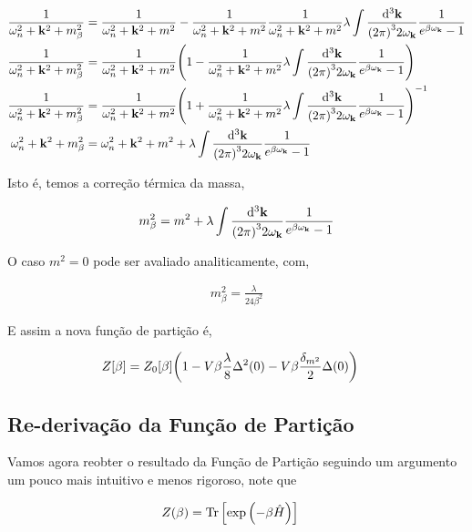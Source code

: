 \documentclass[twoside]{amsart}
\numberwithin{equation}{section}
\begin{document}
\begin{align}
    \frac{1}{\omega_{n}^2+\vb k^2+m_\beta^2}&=\frac{1}{\omega_n^2+\vb k^2+m^2}-\frac{1}{\omega_{n}^2+\vb k^2+m^2}\frac{1}{\omega_{n}^2+{{\vb k}}^2+m^2}\lambda\int\frac{\dd[3]{\vb k}}{\qty(2\pi)^32\omega_{\vb k}}\frac{1}{e^{\beta\omega_{\vb k}}-1}\\
    \frac{1}{\omega_{n}^2+\vb k^2+m_\beta^2}&=\frac{1}{\omega_n^2+\vb k^2+m^2}\qty(1-\frac{1}{\omega_{n}^2+{{\vb k}}^2+m^2}\lambda\int\frac{\dd[3]{\vb k}}{\qty(2\pi)^32\omega_{\vb k}}\frac{1}{e^{\beta\omega_{\vb k}}-1})\\
    \frac{1}{\omega_{n}^2+\vb k^2+m_\beta^2}&=\frac{1}{\omega_n^2+\vb k^2+m^2}\qty(1+\frac{1}{\omega_{n}^2+{{\vb k}}^2+m^2}\lambda\int\frac{\dd[3]{\vb k}}{\qty(2\pi)^32\omega_{\vb k}}\frac{1}{e^{\beta\omega_{\vb k}}-1})^{-1}\\
    \omega_n^2+\vb k^2+m_\beta^2&=\omega_n^2+\vb k^2+m^2+\lambda\int\frac{\dd[3]{\vb k}}{\qty(2\pi)^32\omega_{\vb k}}\frac{1}{e^{\beta\omega_{\vb k}}-1}
\end{align} 

Isto é, temos a correção térmica da massa,

\begin{align}
    m_\beta^2=m^2+\lambda\int\frac{\dd[3]{\vb k}}{\qty(2\pi)^32\omega_{\vb k}}\frac{1}{e^{\beta\omega_{\vb k}}-1}
\end{align}

O caso $m^2=0$ pode ser avaliado analiticamente, com,

\begin{align}
    m_\beta^2=\frac{\lambda}{24\beta^2}
\end{align}

E assim a nova função de partição é,

\begin{align}
    Z\qty[\beta]&=Z_0[\beta]\qty(1-V\beta\frac{\lambda}{8}\Delta^2\qty(0)-V\beta\frac{\delta_{m^2}}{2}\Delta\qty(0))  
\end{align}

\subsection{Re-derivação da Função de Partição}

Vamos agora reobter o resultado da Função de Partição seguindo um argumento um pouco mais intuitivo e menos rigoroso, 
note que

\begin{align}
    Z\qty(\beta)&=\Tr\qty[\exp\qty(-\beta\hat H)]
\end{align}
\end{document}
